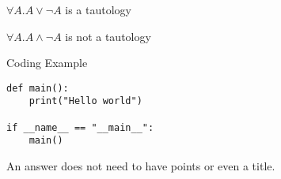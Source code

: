 \documentclass{exsheetans}  %
\author{[123456]~Author~Name, [123457]~Author2~Name} %
\begin{document}
\begin{quiz}
	\item $\forall A.A\lor\neg A$ is a tautology
    \item $\forall A.A\land\neg A$ is not a tautology
\end{quiz}
\begin{answer}[3.2]{Coding Example}
    \begin{verbatim}
def main():
    print("Hello world")

if __name__ == "__main__":
    main()
    \end{verbatim}
\end{answer}
\begin{answer}{}
    An answer does not need to have points or even a title.
\end{answer}
\end{document}
